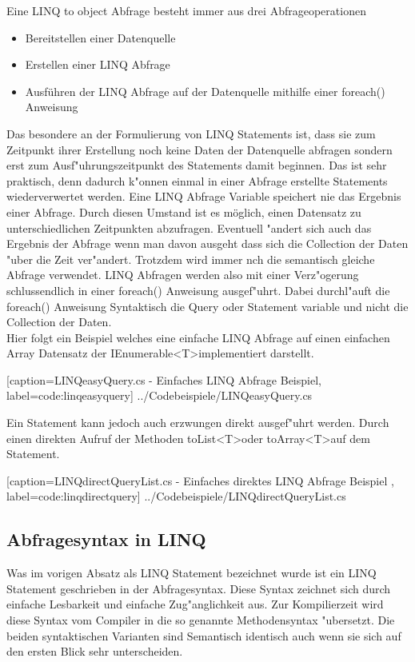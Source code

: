 \documentclass[pagesize, paper=a4, fontsize=12pt,titlepage=true, headings=small, headnosepline, abstractoff, liststotoc, nochapterprefix, plainheadsepline]{scrreprt}
\newcommand{\GTS}{\textless T\textgreater\space}
\begin{document}
Eine LINQ to object Abfrage besteht immer aus drei Abfrageoperationen
\begin{itemize}
\item Bereitstellen einer Datenquelle
\item Erstellen einer LINQ Abfrage
\item Ausführen der LINQ Abfrage auf der Datenquelle mithilfe einer foreach() Anweisung
\end{itemize}
Das besondere an der Formulierung von LINQ Statements ist, dass sie zum Zeitpunkt ihrer Erstellung noch keine Daten der Datenquelle abfragen sondern erst zum Ausf"uhrungszeitpunkt des Statements damit beginnen. Das ist sehr praktisch, denn dadurch k"onnen einmal in einer Abfrage erstellte Statements wiederverwertet werden. Eine LINQ Abfrage Variable speichert nie das Ergebnis einer Abfrage. Durch diesen Umstand ist es möglich, einen Datensatz zu unterschiedlichen Zeitpunkten abzufragen. Eventuell "andert sich auch das Ergebnis der Abfrage wenn man davon ausgeht dass sich die Collection der Daten "uber die Zeit ver"andert. Trotzdem wird immer nch die semantisch gleiche Abfrage verwendet. LINQ Abfragen werden also mit einer Verz"ogerung schlussendlich in einer foreach() Anweisung ausgef"uhrt. Dabei durchl"auft die foreach() Anweisung Syntaktisch die Query oder Statement variable und nicht die Collection der Daten.
\\
Hier folgt ein Beispiel welches eine einfache LINQ Abfrage auf einen einfachen Array Datensatz der IEnumerable\GTS implementiert darstellt.

			[caption={LINQeasyQuery.cs - Einfaches LINQ Abfrage Beispiel}, label=code:linqeasyquery]
			{../Codebeispiele/LINQeasyQuery.cs}

Ein Statement kann jedoch auch erzwungen direkt ausgef"uhrt werden. Durch einen direkten Aufruf der Methoden toList\GTS oder toArray\GTS auf dem Statement.

			[caption={LINQdirectQueryList.cs - Einfaches direktes LINQ Abfrage Beispiel} \protect\cite{MicrosoftCReferenz.2013}, label=code:linqdirectquery]
			{../Codebeispiele/LINQdirectQueryList.cs}
		\subsection {Abfragesyntax in LINQ}
		Was im vorigen Absatz als LINQ Statement bezeichnet wurde ist ein LINQ Statement geschrieben in der Abfragesyntax. Diese Syntax zeichnet sich durch einfache Lesbarkeit und einfache Zug"anglichkeit aus. Zur Kompilierzeit wird diese Syntax vom Compiler in die so genannte Methodensyntax "ubersetzt. Die beiden syntaktischen Varianten sind Semantisch identisch auch wenn sie sich auf den ersten Blick sehr unterscheiden.
\end{document}
